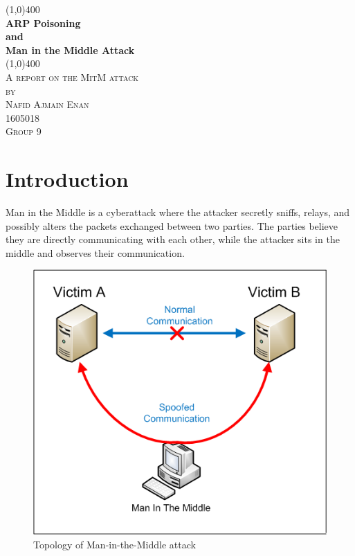 \documentclass[12pt]{article}
\begin{document}

\begin{titlepage}
    \begin{center}
        \line(1,0){400} \\
        [0.25in]
        \huge{\bfseries ARP Poisoning} \\
        \huge{\bfseries and} \\
        \huge{\bfseries Man in the Middle Attack} \\
        [2mm]
        \line(1,0){400}\\
        [2cm]
        \textsc{\Large A report on the MitM attack} \\
        [2cm]
        \textsc{\small by} \\
        \textsc{\large Nafid Ajmain Enan} \\
        \textsc{\large 1605018} \\
        \textsc{\large Group 9} \\
    \end{center}

\end{titlepage}

\section{Introduction}

Man in the Middle is a cyberattack where the attacker secretly sniffs, relays,
and possibly alters the packets exchanged between two parties. The parties
believe they are directly communicating with each other, while the attacker sits
in the middle and observes their communication.

\vspace{1cm}

\begin{figure}[h]
    \centering
    \includegraphics[scale=0.75]{topology}
    \caption{Topology of Man-in-the-Middle attack}
\end{figure}
\end{document}
